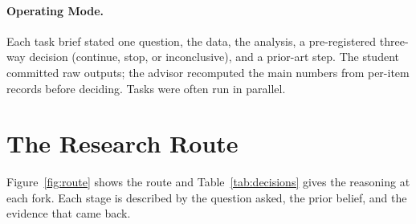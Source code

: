 \documentclass[11pt]{article}
\begin{document}
\paragraph{Operating Mode.} Each task brief stated one question, the data, the analysis, a pre-registered three-way decision (continue, stop, or inconclusive), and a prior-art step. The student committed raw outputs; the advisor recomputed the main numbers from per-item records before deciding. Tasks were often run in parallel.

\section{The Research Route}
\label{sec:route}

Figure~\ref{fig:route} shows the route and Table~\ref{tab:decisions} gives the reasoning at each fork. Each stage is described by the question asked, the prior belief, and the evidence that came back.
\end{document}
